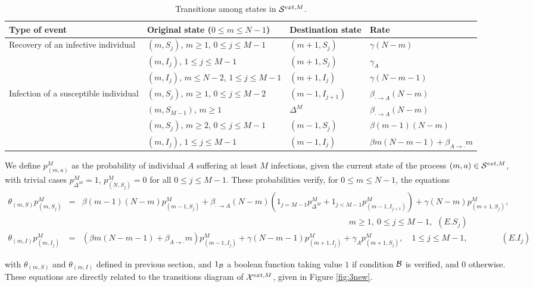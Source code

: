 \documentclass[10pt,A4paper]{article}
\begin{document}
\begin{table}[h]
\centering
\begin{tabular}{|l|l|l|l|}
\hline
Type of event & Original state ($0\leq m\leq N-1$) & Destination state & Rate\\
\hline
Recovery of an infective individual & $(m,S_j)$, $m\geq1$, $0\leq j\leq M-1$ & $(m+1,S_j)$ & $\gamma(N-m)$\\
 & $(m,I_j)$, $1\leq j\leq M-1$ & $(m+1,S_j)$ & $\gamma_A$\\
 & $(m,I_j)$, $m\leq N-2$, $1\leq j\leq M-1$ & $(m+1,I_j)$ & $\gamma(N-m-1)$\\
\hline
Infection of a susceptible individual & $(m,S_j)$, $m\geq1$, $0\leq j\leq M-2$ & $(m-1,I_{j+1})$ & $\beta_{\cdot\rightarrow A}(N-m)$\\
 & $(m,S_{M-1})$, $m\geq1$ & $\Delta^M$ & $\beta_{\cdot\rightarrow A}(N-m)$\\
 & $(m,S_j)$, $m\geq2$, $0\leq j\leq M-1$ & $(m-1,S_j)$ & $\beta(m-1)(N-m)$\\
 & $(m,I_j)$, $1\leq j\leq M-1$ & $(m-1,I_j)$ & $\beta m(N-m-1)+\beta_{A\rightarrow\cdot}m$\\
\hline
\end{tabular}
\caption{Transitions among states in ${\cal S}^{ext,M}$.}
\label{tab:new1}
\end{table}

\par We define $p^M_{(m,a)}$ as the probability of individual $A$ suffering at least $M$ infections, given the current state of the process $(m,a)\in{\cal S}^{ext,M}$,
with trivial cases $p^M_{\Delta^M}=1$, $p^M_{(N,S_j)}=0$ for all $0\leq j\leq M-1$. These probabilities verify, for $0\leq m\leq N-1$, the equations
\begin{eqnarray}
 \theta_{(m,S)}p^M_{(m,S_j)} &=& \beta(m-1)(N-m)p^M_{(m-1,S_j)}+\beta_{\cdot\rightarrow A}(N-m)\left(1_{j=M-1}p^M_{\Delta^M}+1_{j<M-1}p^M_{(m-1,I_{j+1})}\right)+\gamma(N-m)p^M_{(m+1,S_j)},\nonumber\\
&&\quad\quad\quad\quad\quad\quad\quad\quad\quad\quad\quad\quad\quad\quad\quad\quad\quad\quad\quad\quad\quad\quad\quad\quad\quad\quad\quad\quad\quad\quad\quad\quad m\geq1,\ 0\leq j\leq M-1,\ \ (E.S_j) \label{ESj}\nonumber\\
\theta_{(m,I)}p^M_{(m,I_j)} &=& \left(\beta m(N-m-1)+\beta_{A\rightarrow\cdot}m\right)p^M_{(m-1,I_j)}+\gamma(N-m-1)p^M_{(m+1,I_j)}+\gamma_Ap^M_{(m+1,S_j)},\quad 1\leq j\leq M-1,\quad\quad\quad\quad (E.I_j) \label{EIj}\nonumber
\end{eqnarray}
\par\noindent with $\theta_{(m,S)}$ and $\theta_{(m,I)}$ defined in previous section, and $1_{\cal B}$ a boolean function taking value $1$ if condition ${\cal B}$ is verified, and $0$ otherwise. These equations are directly related to the transitions diagram of ${\cal X}^{ext,M}$, given in Figure \ref{fig:3new}.
\end{document}
